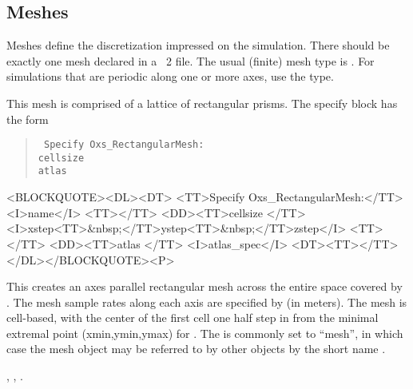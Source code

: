 \subsection{Meshes}\label{sec:Meshes}
Meshes define the discretization impressed on the simulation.  There
should be exactly one mesh declared in a \MIF~2 file.  The usual
(finite) mesh type is .  For simulations that
are periodic along one or more axes, use the
 type.

\begin{description}
\label{html:oxsrectangularmesh}%
\item[Oxs\_RectangularMesh:]
This mesh is comprised of a lattice of rectangular prisms.
The specify block has the form
\begin{latexonly}
\begin{quote}\tt
Specify Oxs\_RectangularMesh: \ocb \\
\bi cellsize \ocb{}\ccb\\
\bi atlas \\
\ccb
\end{quote}
\end{latexonly}
\begin{rawhtml}
<BLOCKQUOTE><DL><DT>
<TT>Specify Oxs_RectangularMesh:</TT><I>name</I> <TT>{</TT>
<DD><TT>cellsize {</TT>
  <I>xstep<TT>&nbsp;</TT>ystep<TT>&nbsp;</TT>zstep</I>
  <TT>}</TT>
<DD><TT>atlas </TT> <I>atlas_spec</I>
<DT><TT>}</TT></DL></BLOCKQUOTE><P>
\end{rawhtml}
This creates an axes parallel rectangular mesh across the entire space
covered by .  The mesh sample rates along each axis are
specified by  (in meters).  The mesh is
cell-based, with the center of the first cell one half step in from the
minimal extremal point (xmin,ymin,ymax) for .
The  is commonly set to ``mesh'', in which case the mesh
object may be referred to by other  objects by the short
name .

\begin{ExampleMifs}
 , , .
\end{ExampleMifs}


\end{description}
